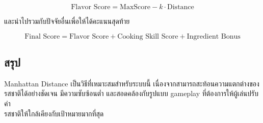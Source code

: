 \[
\text{Flavor Score} = \text{MaxScore} - k \cdot \text{Distance}
\]

และนำไปรวมกับปัจจัยอื่นเพื่อให้ได้คะแนนสุดท้าย

\[
\text{Final Score} = \text{Flavor Score} + \text{Cooking Skill Score} + \text{Ingredient Bonus}
\]

\subsection{สรุป}
\hspace{1.5em}Manhattan Distance เป็นวิธีที่เหมาะสมสำหรับระบบนี้ เนื่องจากสามารถสะท้อนความแตกต่างของรสชาติได้อย่างชัดเจน มีความซับซ้อนต่ำ และสอดคล้องกับรูปแบบ gameplay ที่ต้องการให้ผู้เล่นปรับค่า\\รสชาติให้ใกล้เคียงกับเป้าหมายมากที่สุด
